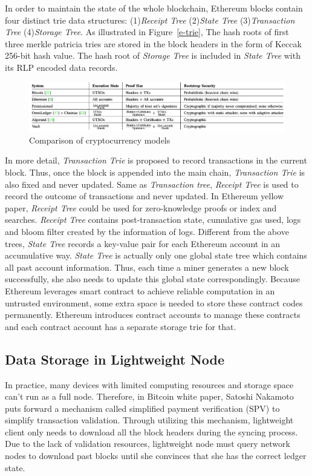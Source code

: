 \documentclass[conference]{IEEEtran}
\begin{document}
In order to maintain the state of the whole blockchain, Ethereum blocks contain four distinct trie data structures: (1)\textit{Receipt Tree} (2)\textit{State Tree} (3)\textit{Transaction Tree} (4)\textit{Storage Tree}.
%
As illustrated in Figure~\ref{e-trie}, The hash roots of first three merkle patricia tries are stored in the block headers in the form of Keccak 256-bit hash value. 
%
The hash root of \textit{Storage Tree} is included in \textit{State Tree} with its RLP encoded data records.

\begin{figure}
  \centering
  \includegraphics[width=\linewidth]{figs/summary.png}
  \caption{Comparison of cryptocurrency models}
  \label{compare}
\end{figure}

In more detail, \textit{Transaction Trie} is proposed to record transactions in the current block.
%
Thus, once the block is appended into the main chain, \textit{Transaction Trie} is also fixed and never updated.
%
Same as \textit{Transaction tree}, \textit{Receipt Tree} is used to record the outcome of transactions and never updated.
%
In Ethereum yellow paper\cite{Ethereumstorage}, \textit{Receipt Tree} could be used for zero-knowledge proofs or index and searches.
%
\textit{Receipt Tree} contains post-transaction state, cumulative gas used, logs and bloom filter created by the information of logs.
%
Different from the above trees, \textit{State Tree} records a key-value pair for each Ethereum account in an accumulative way.
%
\textit{State Tree} is actually only one global state tree which contains all past account information.
%
Thus, each time a miner generates a new block successfully, she also needs to update this global state correspondingly.
%
Because Ethereum leverages smart contract to achieve reliable computation in an untrusted environment, some extra space is needed to store these contract codes permanently.
%
Ethereum introduces contract accounts to manage these contracts and each contract account has a separate storage trie for that.


\subsection{Data Storage in Lightweight Node}
In practice, many devices with limited computing resources and storage space can't run as a full node.
%
Therefore, in Bitcoin white paper\cite{nakamoto2008bitcoin}, Satoshi Nakamoto puts forward a mechanism called simplified payment verification (SPV) to simplify transaction validation.
%
Through utilizing this mechanism, lightweight client only needs to download all the block headers during the syncing process.
%
Due to the lack of validation resources, lightweight node must query network nodes to download past blocks until she convinces that she has the correct ledger state.
\end{document}
